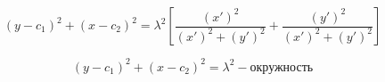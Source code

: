 \documentclass[12pt, a4paper]{report}
\begin{document}
\[ \displaystyle (y- c_1 ) ^2 + (x- c_2 ) ^2 = \lambda ^2 \left[ \frac{(x') ^2 }{(x') ^2 + (y ' ) ^2 } + \frac{(y') ^2 }{(x') ^2 + (y ' ) ^2 } \right]  \] 

\[ \displaystyle (y- c_1 ) ^2 + (x- c_2 ) ^2 = \lambda ^2 - \text{окружность}  \] 


\ifdefined\mainfile
\else
    
\end{document}
